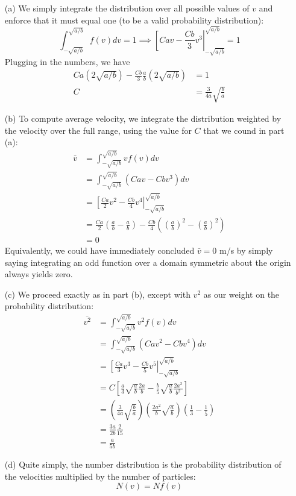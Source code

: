 \documentclass{article}
\begin{document}
\begin{itemize}
	\item[(a)] We simply integrate the distribution over all possible values of $v$ and enforce that it must equal one (to be a valid probability distribution):
	\begin{equation}
	\int_{-\sqrt{a/b}}^{\sqrt{a/b}}f(v)dv = 1 \implies \left[ Cav - \frac{Cb}{3}v^3\right|_{-\sqrt{a/b}}^{\sqrt{a/b}} = 1
	\end{equation}
	Plugging in the numbers, we have
	\begin{align*}
	Ca(2\sqrt{a/b})-\frac{Cb}{3}\frac{a}{b}(2\sqrt{a/b}) &= 1 \\
	C &= \frac{3}{4a}\sqrt{\frac{b}{a}}
	\end{align*}
	\item[(b)] To compute average velocity, we integrate the distribution weighted by the velocity over the full range, using the value for $C$ that we cound in part (a):
	\begin{align*}
	\bar{v} &= \int_{-\sqrt{a/b}}^{\sqrt{a/b}}vf(v)dv \\
	&= \int_{-\sqrt{a/b}}^{\sqrt{a/b}}(Cav-Cbv^3)dv \\
	&= \left[ \frac{Ca}{2}v^2 - \frac{Cb}{4}v^4\right|_{-\sqrt{a/b}}^{\sqrt{a/b}} \\
	&= \frac{Ca}{2}\left(\frac{a}{b}-\frac{a}{b}\right) - \frac{Cb}{4}\left(\left(\frac{a}{b}\right)^2-\left(\frac{a}{b}\right)^2\right) \\
	&= 0
	\end{align*}
	Equivalently, we could have immediately concluded $\bar{v} = 0$ m/s by simply saying integrating an odd function over a domain symmetric about the origin always yields zero.
	\item[(c)] We proceed exactly as in part (b), except with $v^2$ as our weight on the probability distribution:
	\begin{align*}
	\bar{v^2} &= \int_{-\sqrt{a/b}}^{\sqrt{a/b}}v^2f(v)dv \\
	&= \int_{-\sqrt{a/b}}^{\sqrt{a/b}}(Cav^2-Cbv^4)dv \\
	&= \left[ \frac{Ca}{3}v^3 - \frac{Cb}{5}v^5\right|_{-\sqrt{a/b}}^{\sqrt{a/b}} \\
	&= C\left[\frac{a}{3}\sqrt{\frac{a}{b}}\frac{2a}{b}-\frac{b}{5}\sqrt{\frac{a}{b}}\frac{2a^2}{b^2}\right] \\
	&= \left(\frac{3}{4a}\sqrt{\frac{b}{a}}\right)\left(\frac{2a^2}{b}\sqrt{\frac{a}{b}}\right)\left(\frac{1}{3}-\frac{1}{5}\right) \\
	&= \frac{3a}{2b}\frac{2}{15} \\
	&= \frac{a}{5b}
	\end{align*}
	\item[(d)] Quite simply, the number distribution is the probability distribution of the velocities multiplied by the number of particles:
	\begin{equation}
	N(v) = Nf(v)
	\end{equation}
\end{itemize}
\end{document}
